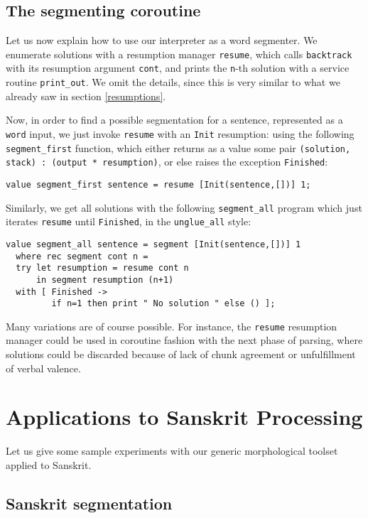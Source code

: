 \subsection{The segmenting coroutine}

Let us now explain how to use our interpreter as a word segmenter.
We enumerate solutions with a resumption manager \verb:resume:, which 
calls \verb:backtrack: with its resumption argument \verb:cont:, and prints
the \verb:n:-th solution with a service routine \verb:print_out:.
We omit the details, since this is very similar to what we already saw in
section \ref{resumptions}.

Now, in order to find a possible segmentation for a sentence, 
represented as a \verb:word: input, we just invoke \verb:resume: with
an \verb:Init: resumption: using the following \verb:segment_first: 
function, which either returns as a value some
pair \verb!(solution, stack) : (output * resumption)!,
or else raises the exception \verb:Finished::
\begin{verbatim}
value segment_first sentence = resume [Init(sentence,[])] 1;
\end{verbatim}

Similarly, we get all solutions with the following \verb:segment_all: 
program which just iterates \verb:resume: until \verb:Finished:,
in the \verb:unglue_all: style:

\begin{verbatim}
value segment_all sentence = segment [Init(sentence,[])] 1
  where rec segment cont n = 
  try let resumption = resume cont n
      in segment resumption (n+1)
  with [ Finished ->
         if n=1 then print " No solution " else () ];
\end{verbatim}

Many variations are of course possible. For instance, the \verb:resume:
resumption manager could be used in coroutine fashion with the next phase of
parsing, where solutions could be discarded because of lack of chunk %
agreement or unfulfillment of verbal valence. 

\section{Applications to Sanskrit Processing}

Let us give some sample experiments with our
generic morphological toolset applied to Sanskrit.

\subsection{Sanskrit segmentation}

